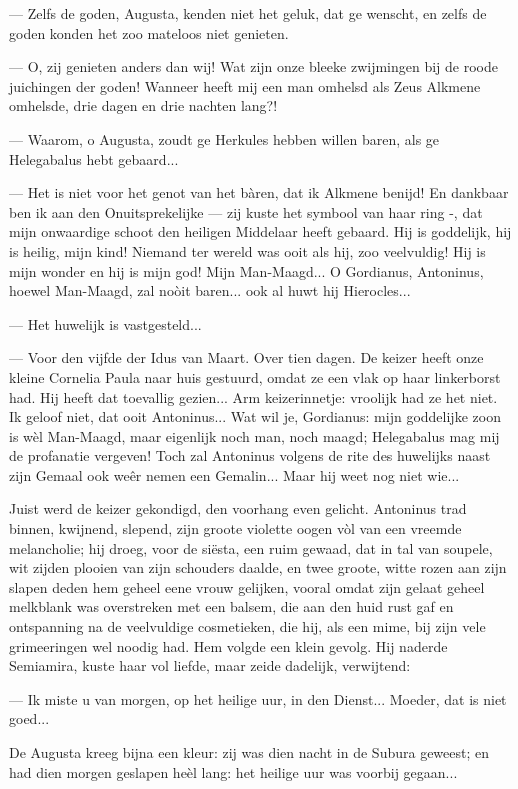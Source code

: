 \documentclass[a4paper, 12pt, oneside, dutch]{article}
\begin{document}
--- Zelfs de goden, Augusta, kenden niet het geluk, dat ge wenscht, en zelfs de goden konden het zoo mateloos niet genieten.

--- O, zij genieten anders dan wij! Wat zijn onze bleeke zwijmingen bij de roode juichingen der goden! Wanneer heeft mij een man omhelsd als Zeus Alkmene omhelsde, drie dagen en drie nachten lang?!

--- Waarom, o Augusta, zoudt ge Herkules hebben willen baren, als ge Helegabalus hebt gebaard...

--- Het is niet voor het genot van het bàren, dat ik Alkmene benijd! En dankbaar ben ik aan den Onuitsprekelijke --- zij kuste het symbool van haar ring -, dat mijn onwaardige schoot den heiligen Middelaar heeft gebaard. Hij is goddelijk, hij is heilig, mijn kind! Niemand ter wereld was ooit als hij, zoo veelvuldig! Hij is mijn wonder en hij is mijn god! Mijn Man-Maagd... O Gordianus, Antoninus, hoewel Man-Maagd, zal noòit baren... ook al huwt hij Hierocles...

--- Het huwelijk is vastgesteld...

--- Voor den vijfde der Idus van Maart. Over tien dagen. De keizer heeft onze kleine Cornelia Paula naar huis gestuurd, omdat ze een vlak op haar linkerborst had. Hij heeft dat toevallig gezien... Arm keizerinnetje: vroolijk had ze het niet. Ik geloof niet, dat ooit Antoninus... Wat wil je, Gordianus: mijn goddelijke zoon is wèl Man-Maagd, maar eigenlijk noch man, noch maagd; Helegabalus mag mij de profanatie vergeven! Toch zal Antoninus volgens de rite des huwelijks naast zijn Gemaal ook weêr nemen een Gemalin... Maar hij weet nog niet wie...

Juist werd de keizer gekondigd, den voorhang even gelicht. Antoninus trad binnen, kwijnend, slepend, zijn groote violette oogen vòl van een vreemde melancholie; hij droeg, voor de siësta, een ruim gewaad, dat in tal van soupele, wit zijden plooien van zijn schouders daalde, en twee groote, witte rozen aan zijn slapen deden hem geheel eene vrouw gelijken, vooral omdat zijn gelaat geheel melkblank was overstreken met een balsem, die aan den huid rust gaf en ontspanning na de veelvuldige cosmetieken, die hij, als een mime, bij zijn vele grimeeringen wel noodig had. Hem volgde een klein gevolg. Hij naderde Semiamira, kuste haar vol liefde, maar zeide dadelijk, verwijtend:

--- Ik miste u van morgen, op het heilige uur, in den Dienst... Moeder, dat is niet goed...

De Augusta kreeg bijna een kleur: zij was dien nacht in de Subura geweest; en had dien morgen geslapen heèl lang: het heilige uur was voorbij gegaan...
\end{document}

